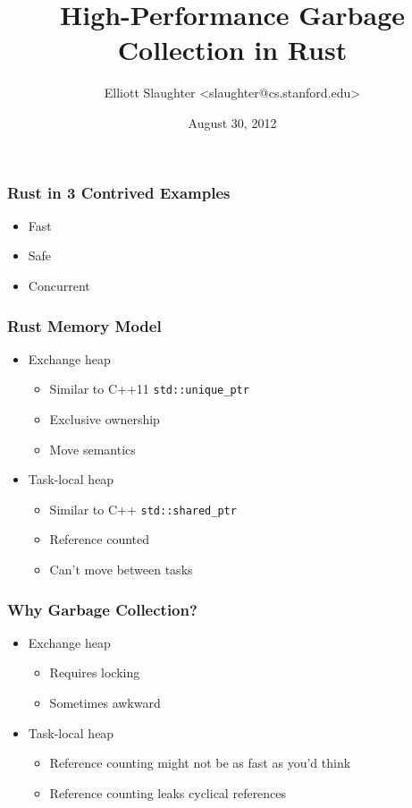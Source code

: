 \documentclass[ignorenonframetext,12pt]{beamer}
\title{High-Performance Garbage Collection in Rust}
\author{Elliott Slaughter \textless{}slaughter@cs.stanford.edu\textgreater{}}
\date{August 30, 2012}
\begin{document}
\frame{\titlepage}

\begin{frame}
\Large{}
\end{frame}

\begin{frame}[fragile]\frametitle{Rust in 3 Contrived Examples}
\begin{itemize}
  \item<alert@2> Fast
  \item<alert@3> Safe
  \item<alert@4> Concurrent
\end{itemize}

\begin{overlayarea}{\textwidth}{\textheight}
\only<2>{}
\only<3>{}
\end{overlayarea}
\end{frame}

\begin{frame}\frametitle{Rust Memory Model}
\begin{itemize}
  \item Exchange heap
  \begin{itemize}
    \item Similar to C++11 \texttt{std::unique\_ptr}
    \item Exclusive ownership
    \item Move semantics
  \end{itemize}
  \item Task-local heap
  \begin{itemize}
    \item Similar to C++ \texttt{std::shared\_ptr}
    \item Reference counted
    \item Can't move between tasks
  \end{itemize}
\end{itemize}
\end{frame}

\begin{frame}\frametitle{Why Garbage Collection?}
\begin{itemize}
  \item Exchange heap
  \begin{itemize}
    \item Requires locking
    \item Sometimes awkward
  \end{itemize}
  \item Task-local heap
  \begin{itemize}
    \item Reference counting might not be as fast as you'd think
    \item Reference counting leaks cyclical references
  \end{itemize}
\end{itemize}
\end{frame}
\end{document}
